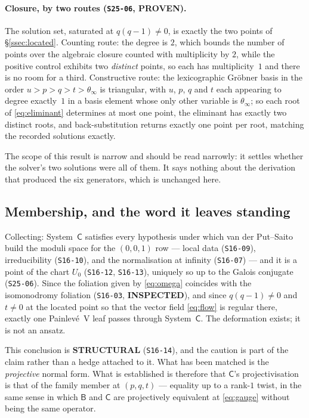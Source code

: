 \paragraph{Closure, by two routes (\texttt{S25-06}, \textbf{PROVEN}).}
The solution set, saturated at $q(q-1)\neq0$, is exactly the two points of
\S\ref{ssec:located}. Counting route: the degree is $2$, which bounds the
number of points over the algebraic closure counted with multiplicity by $2$,
while the positive control exhibits two \emph{distinct} points, so each has
multiplicity~$1$ and there is no room for a third. Constructive route: the
lexicographic Gr\"obner basis in the order $u>p>q>t>\theta_\infty$ is
triangular, with $u$, $p$, $q$ and $t$ each appearing to degree exactly~$1$ in
a basis element whose only other variable is $\theta_\infty$; so each root of
\eqref{eq:eliminant} determines at most one point, the eliminant has exactly
two distinct roots, and back-substitution returns exactly one point per root,
matching the recorded solutions exactly.

The scope of this result is narrow and should be read narrowly: it settles
whether the solver's two solutions were all of them. It says nothing about the
derivation that produced the six generators, which is unchanged here.

\subsection{Membership, and the word it leaves standing}
\label{ssec:membership-verdict}

Collecting: System~$\mathsf C$ satisfies every hypothesis under which van der
Put--Saito build the moduli space for the $(0,0,1)$ row --- local data
(\texttt{S16-09}), irreducibility (\texttt{S16-10}), and the normalisation at
infinity (\texttt{S16-07}) --- and it is a point of the chart $U_0$
(\texttt{S16-12}, \texttt{S16-13}), uniquely so up to the Galois conjugate
(\texttt{S25-06}). Since the foliation given by \eqref{eq:omega} coincides with
the isomonodromy foliation (\texttt{S16-03}, \textbf{INSPECTED}), and since
$q(q-1)\neq0$ and $t\neq0$ at the located point so that the vector field
\eqref{eq:flow} is regular there, exactly one Painlev\'e~V leaf passes through
System~$\mathsf C$. The deformation exists; it is not an ansatz.

This conclusion is \textbf{STRUCTURAL} (\texttt{S16-14}), and the caution is
part of the claim rather than a hedge attached to it. What has been matched is
the \emph{projective} normal form. What is established is therefore that
$\mathsf C$'s projectivisation is that of the family member at $(p,q,t)$ ---
equality up to a rank-$1$ twist, in the same sense in which $\mathsf B$ and
$\mathsf C$ are projectively equivalent at \eqref{eq:gauge} without being the
same operator.

